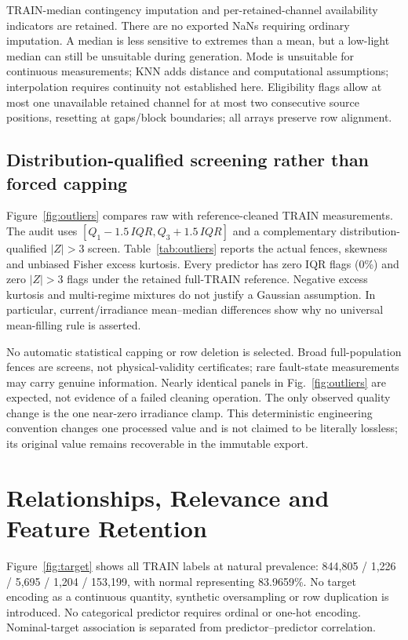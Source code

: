 \documentclass[conference]{IEEEtran}
\begin{document}
TRAIN-median contingency imputation and per-retained-channel availability indicators are retained. There are no exported NaNs requiring ordinary imputation. A median is less sensitive to extremes than a mean, but a low-light median can still be unsuitable during generation. Mode is unsuitable for continuous measurements; KNN adds distance and computational assumptions; interpolation requires continuity not established here. Eligibility flags allow at most one unavailable retained channel for at most two consecutive source positions, resetting at gaps/block boundaries; all arrays preserve row alignment.

\subsection{Distribution-qualified screening rather than forced capping}
Figure~\ref{fig:outliers} compares raw with reference-cleaned TRAIN measurements. The audit uses $[Q_1-1.5\,IQR,Q_3+1.5\,IQR]$ and a complementary distribution-qualified $|Z|>3$ screen. Table~\ref{tab:outliers} reports the actual fences, skewness and unbiased Fisher excess kurtosis. Every predictor has zero IQR flags (0\%) and zero $|Z|>3$ flags under the retained full-TRAIN reference. Negative excess kurtosis and multi-regime mixtures do not justify a Gaussian assumption. In particular, current/irradiance mean--median differences show why no universal mean-filling rule is asserted.

No automatic statistical capping or row deletion is selected. Broad full-population fences are screens, not physical-validity certificates; rare fault-state measurements may carry genuine information. Nearly identical panels in Fig.~\ref{fig:outliers} are expected, not evidence of a failed cleaning operation. The only observed quality change is the one near-zero irradiance clamp. This deterministic engineering convention changes one processed value and is not claimed to be literally lossless; its original value remains recoverable in the immutable export.

\section{Relationships, Relevance and Feature Retention}
Figure~\ref{fig:target} shows all TRAIN labels at natural prevalence: 844,805 / 1,226 / 5,695 / 1,204 / 153,199, with normal representing 83.9659\%. No target encoding as a continuous quantity, synthetic oversampling or row duplication is introduced. No categorical predictor requires ordinal or one-hot encoding. Nominal-target association is separated from predictor--predictor correlation.
\end{document}

